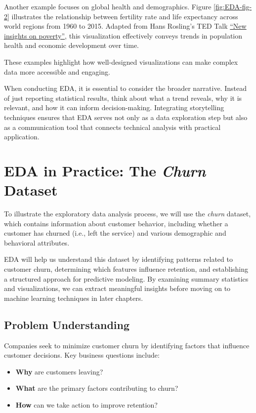 \documentclass[
]{book}
\providecommand{\tightlist}{%
  \setlength{\itemsep}{0pt}\setlength{\parskip}{0pt}}
\theoremstyle{definition}
\theoremstyle{definition}
\theoremstyle{definition}
\theoremstyle{definition}
\theoremstyle{remark}
\begin{document}
Another example focuses on global health and demographics. Figure \ref{fig:EDA-fig-2} illustrates the relationship between fertility rate and life expectancy across world regions from 1960 to 2015. Adapted from Hans Rosling's TED Talk \href{https://www.ted.com/talks/hans_rosling_new_insights_on_poverty}{``New insights on poverty''}, this visualization effectively conveys trends in population health and economic development over time.

These examples highlight how well-designed visualizations can make complex data more accessible and engaging.

When conducting EDA, it is essential to consider the broader narrative. Instead of just reporting statistical results, think about what a trend reveals, why it is relevant, and how it can inform decision-making. Integrating storytelling techniques ensures that EDA serves not only as a data exploration step but also as a communication tool that connects technical analysis with practical application.

\section{\texorpdfstring{EDA in Practice: The \emph{Churn} Dataset}{EDA in Practice: The Churn Dataset}}\label{EDA-sec-churn}

To illustrate the exploratory data analysis process, we will use the \emph{churn} dataset, which contains information about customer behavior, including whether a customer has churned (i.e., left the service) and various demographic and behavioral attributes.

EDA will help us understand this dataset by identifying patterns related to customer churn, determining which features influence retention, and establishing a structured approach for predictive modeling. By examining summary statistics and visualizations, we can extract meaningful insights before moving on to machine learning techniques in later chapters.

\subsection*{Problem Understanding}\label{problem-understanding-1}

Companies seek to minimize customer churn by identifying factors that influence customer decisions. Key business questions include:

\begin{itemize}
\tightlist
\item
  \textbf{Why} are customers leaving?\\
\item
  \textbf{What} are the primary factors contributing to churn?\\
\item
  \textbf{How} can we take action to improve retention?
\end{itemize}
\end{document}
